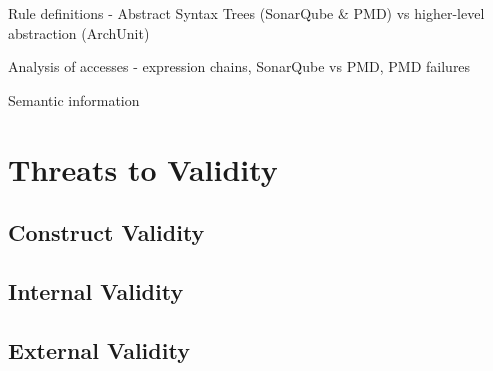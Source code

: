 Rule definitions - Abstract Syntax Trees (SonarQube \& PMD) vs higher-level abstraction (ArchUnit)

Analysis of accesses - expression chains, SonarQube vs PMD, PMD failures

Semantic information



\section{Threats to Validity}

\subsection{Construct Validity}

\subsection{Internal Validity}

\subsection{External Validity}